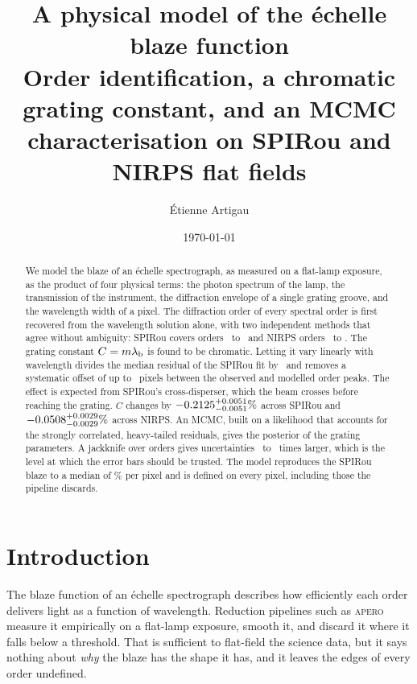 \documentclass[11pt,a4paper]{article}
\title{A physical model of the \'echelle blaze function\\[0.3em]
\large Order identification, a chromatic grating constant, and an MCMC characterisation on SPIRou and NIRPS flat fields}
\author{\'Etienne Artigau}
\date{\today}
\newcommand{\lamb}{\lambda_{\rm b}}
\newcommand{\apero}{\textsc{apero}}
\begin{document}
\maketitle

\begin{abstract}
We model the blaze of an \'echelle spectrograph, as measured on a flat-lamp exposure, as the product of four physical terms: the photon spectrum of the lamp, the transmission of the instrument, the diffraction envelope of a single grating groove, and the wavelength width of a pixel. The diffraction order of every spectral order is first recovered from the wavelength solution alone, with two independent methods that agree without ambiguity: SPIRou covers orders \spMfirst\ to \spMlast\ and NIRPS orders \niMfirst\ to \niMlast. The grating constant $C = m\lamb$ is found to be chromatic. Letting it vary linearly with wavelength divides the median residual of the SPIRou fit by \spMedRatioConst\ and removes a systematic offset of up to \spPkConstMax\ pixels between the observed and modelled order peaks. The effect is expected from SPIRou's cross-disperser, which the beam crosses before reaching the grating. $C$ changes by $-0.2125^{+0.0051}_{-0.0051}\%$ across SPIRou and $-0.0508^{+0.0029}_{-0.0029}\%$ across NIRPS. An MCMC, built on a likelihood that accounts for the strongly correlated, heavy-tailed residuals, gives the posterior of the grating parameters. A jackknife over orders gives uncertainties \MinRatio\ to \MaxRatio\ times larger, which is the level at which the error bars should be trusted. The model reproduces the SPIRou blaze to a median of \spMedRel\% per pixel and is defined on every pixel, including those the pipeline discards.
\end{abstract}

\tableofcontents

\section{Introduction}

The blaze function of an \'echelle spectrograph describes how efficiently each order delivers light as a function of wavelength. Reduction pipelines such as \apero\ \citep{Cook2022} measure it empirically on a flat-lamp exposure, smooth it, and discard it where it falls below a threshold. That is sufficient to flat-field the science data, but it says nothing about \emph{why} the blaze has the shape it has, and it leaves the edges of every order undefined.
\end{document}
